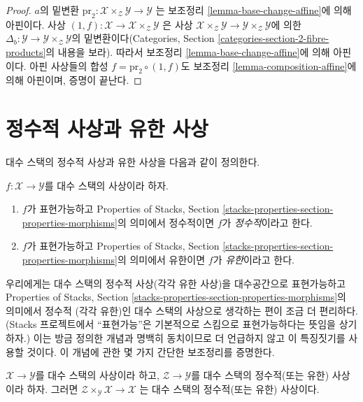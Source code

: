 \begin{proof}
$a$의 밑변환
$\text{pr}_2 : \mathcal{X} \times_\mathcal{Z} \mathcal{Y} \to \mathcal{Y}$
는 보조정리 \ref{lemma-base-change-affine}에 의해 아핀이다. 사상
$(1, f) : \mathcal{X} \to \mathcal{X} \times_\mathcal{Z} \mathcal{Y}$
은 사상 $\mathcal{X} \times_\mathcal{Z} \mathcal{Y} \to
\mathcal{Y} \times_\mathcal{Z} \mathcal{Y}$에 의한
$\Delta_b : \mathcal{Y} \to \mathcal{Y} \times_\mathcal{Z} \mathcal{Y}$의
밑변환이다(Categories, Section
\ref{categories-section-2-fibre-products}의 내용을 보라).
따라서 보조정리 \ref{lemma-base-change-affine}에 의해 아핀이다.
아핀 사상들의 합성 $f = \text{pr}_2 \circ (1, f)$도 보조정리
\ref{lemma-composition-affine}에 의해 아핀이며, 증명이 끝난다.
\end{proof}





\section{정수적 사상과 유한 사상}
\label{section-integral}

\noindent
대수 스택의 정수적 사상과 유한 사상을 다음과 같이 정의한다.

\begin{definition}
\label{definition-integral}
$f : \mathcal{X} \to \mathcal{Y}$를 대수 스택의 사상이라 하자.
\begin{enumerate}
\item $f$가 표현가능하고 Properties of Stacks, Section
\ref{stacks-properties-section-properties-morphisms}의 의미에서 정수적이면
$f$가 {\it 정수적}이라고 한다.
\item $f$가 표현가능하고 Properties of Stacks, Section
\ref{stacks-properties-section-properties-morphisms}의 의미에서 유한이면
$f$가 {\it 유한}이라고 한다.
\end{enumerate}
\end{definition}

\noindent
우리에게는 대수 스택의 정수적 사상(각각 유한 사상)을 대수공간으로
표현가능하고 Properties of Stacks, Section
\ref{stacks-properties-section-properties-morphisms}의 의미에서 정수적
(각각 유한)인 대수 스택의 사상으로 생각하는 편이 조금 더 편리하다.
(Stacks 프로젝트에서 ``표현가능''은 기본적으로 스킴으로 표현가능하다는
뜻임을 상기하자.) 이는 방금 정의한 개념과 명백히 동치이므로 더 언급하지
않고 이 특징짓기를 사용할 것이다. 이 개념에 관한 몇 가지 간단한
보조정리를 증명한다.

\begin{lemma}
\label{lemma-base-change-integral}
$\mathcal{X} \to \mathcal{Y}$를 대수 스택의 사상이라 하고,
$\mathcal{Z} \to \mathcal{Y}$를 대수 스택의 정수적(또는 유한) 사상이라
하자. 그러면
$\mathcal{Z} \times_\mathcal{Y} \mathcal{X} \to \mathcal{X}$
는 대수 스택의 정수적(또는 유한) 사상이다.
\end{lemma}

